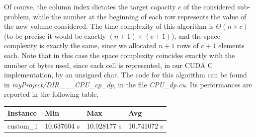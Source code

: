 \documentclass[12pt]{extarticle}
\begin{document}
Of course, the column index dictates the target capacity $c$ of the considered sub-problem, while the number at the beginning of each row represents the value of the new volume considered.\newline
The time complexity of this algorithm is $\Theta(n \times c)$ (to be precise it would be exactly $(n+1) \times (c+1)$), and the space complexity is exactly the same, since we allocated $n+1$ rows of $c+1$ elements each. Note that in this case the space complexity coincides exactly with the number of bytes used, since each cell is represented, in our CUDA C implementation, by an unsigned char.\newline
The code for this algorithm can be found in \emph{myProject/DIR\_\_\_CPU\_cp\_dp}, in the file \emph{CPU\_dp.cu}.\newline
Its performances are reported in the following table.
\begin{center}
\begin{tabular}{ | m{2.2cm} | m{2.2cm} | m{2.2cm} | m{2.2cm} |}
 \hline
 Instance & Min & Max & Avg\\
 \hline
 custom\_1 & 10.637604 s & 10.928177 s & 10.741072 s\\
 \hline
\end{tabular}
\end{center}
\end{document}
